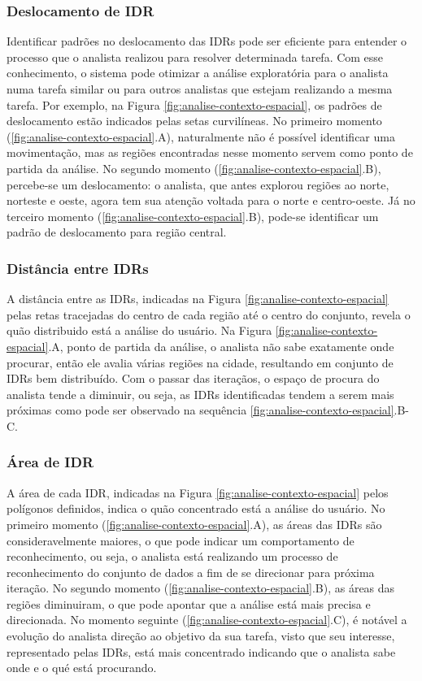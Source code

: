 \subsubsection{Deslocamento de IDR}

Identificar padrões no deslocamento das IDRs pode ser eficiente para entender o processo que o analista realizou para resolver determinada tarefa. Com esse conhecimento, o sistema pode otimizar a análise exploratória para o analista numa tarefa similar ou para outros analistas que estejam realizando a mesma tarefa. Por exemplo, na Figura \ref{fig:analise-contexto-espacial}, os padrões de deslocamento estão indicados pelas setas curvilíneas. No primeiro momento (\ref{fig:analise-contexto-espacial}.A), naturalmente não é possível identificar uma movimentação, mas as regiões encontradas nesse momento servem como ponto de partida da análise. No segundo momento (\ref{fig:analise-contexto-espacial}.B), percebe-se um deslocamento: o analista, que antes explorou regiões ao norte, norteste e oeste, agora tem sua atenção voltada para o norte e centro-oeste. Já no terceiro momento (\ref{fig:analise-contexto-espacial}.B), pode-se identificar um padrão de deslocamento para região central.

\subsubsection{Distância entre IDRs}

A distância entre as IDRs, indicadas na Figura \ref{fig:analise-contexto-espacial} pelas retas tracejadas do centro de cada região até o centro do conjunto, revela o quão distribuido está a análise do usuário. Na Figura \ref{fig:analise-contexto-espacial}.A, ponto de partida da análise, o analista não sabe exatamente onde procurar, então ele avalia várias regiões na cidade, resultando em conjunto de IDRs bem distribuído. Com o passar das iteraçãos, o espaço de procura do analista tende a diminuir, ou seja, as IDRs identificadas tendem a serem mais próximas como pode ser observado na sequência \ref{fig:analise-contexto-espacial}.B-C.

\subsubsection{Área de IDR}

A área de cada IDR, indicadas na Figura \ref{fig:analise-contexto-espacial} pelos polígonos definidos, indica o quão concentrado está a análise do usuário. No primeiro momento (\ref{fig:analise-contexto-espacial}.A), as áreas das IDRs são consideravelmente maiores, o que pode indicar um comportamento de reconhecimento, ou seja, o analista está realizando um processo de reconhecimento do conjunto de dados a fim de se direcionar para próxima iteração. No segundo momento (\ref{fig:analise-contexto-espacial}.B), as áreas das regiões diminuiram, o que pode apontar que a análise está mais precisa e direcionada. No momento seguinte (\ref{fig:analise-contexto-espacial}.C), é notável a evolução do analista direção ao objetivo da sua tarefa, visto que seu interesse, representado pelas IDRs, está mais concentrado indicando que o analista sabe onde e o qué está procurando.

